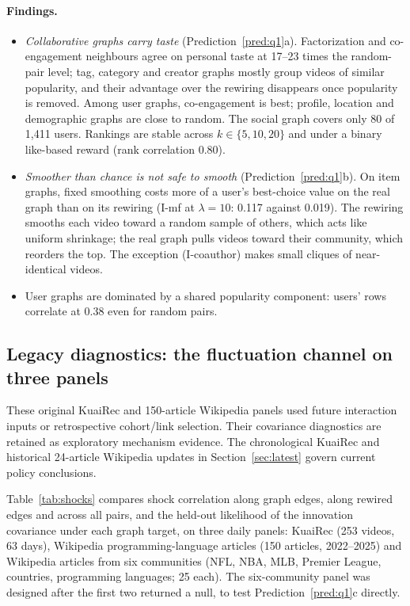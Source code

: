 \documentclass[11pt]{article}
\theoremstyle{definition}
\theoremstyle{remark}
\begin{document}
\paragraph{Findings.}
\begin{itemize}
\item \emph{Collaborative graphs carry taste} (Prediction~\ref{pred:q1}a). Factorization and co-engagement neighbours agree on personal taste at 17--23 times the random-pair level; tag, category and creator graphs mostly group videos of similar popularity, and their advantage over the rewiring disappears once popularity is removed. Among user graphs, co-engagement is best; profile, location and demographic graphs are close to random. The social graph covers only 80 of 1,411 users. Rankings are stable across $k\in\{5,10,20\}$ and under a binary like-based reward (rank correlation 0.80).
\item \emph{Smoother than chance is not safe to smooth} (Prediction~\ref{pred:q1}b). On item graphs, fixed smoothing costs more of a user's best-choice value on the real graph than on its rewiring (I-mf at $\lambda=10$: 0.117 against 0.019). The rewiring smooths each video toward a random sample of others, which acts like uniform shrinkage; the real graph pulls videos toward their community, which reorders the top. The exception (I-coauthor) makes small cliques of near-identical videos.
\item User graphs are dominated by a shared popularity component: users' rows correlate at 0.38 even for random pairs.
\end{itemize}

\subsection{Legacy diagnostics: the fluctuation channel on three panels}

These original KuaiRec and 150-article Wikipedia panels used future interaction inputs or retrospective cohort/link selection. Their covariance diagnostics are retained as exploratory mechanism evidence. The chronological KuaiRec and historical 24-article Wikipedia updates in Section~\ref{sec:latest} govern current policy conclusions.

Table~\ref{tab:shocks} compares shock correlation along graph edges, along rewired edges and across all pairs, and the held-out likelihood of the innovation covariance under each graph target, on three daily panels: KuaiRec (253 videos, 63 days), Wikipedia programming-language articles (150 articles, 2022--2025) and Wikipedia articles from six communities (NFL, NBA, MLB, Premier League, countries, programming languages; 25 each). The six-community panel was designed after the first two returned a null, to test Prediction~\ref{pred:q1}c directly.
\end{document}
